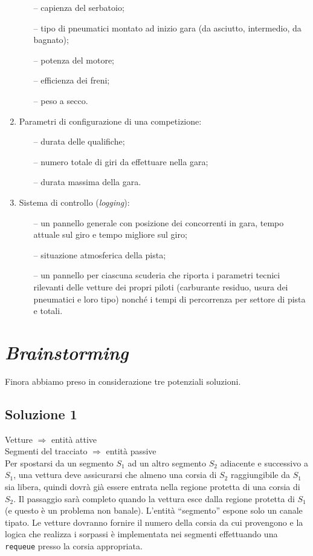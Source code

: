 \documentclass[11pt,a4paper]{report}
\begin{document}
\begin{enumerate}
\begin{itemize}
        \item[--] capienza del serbatoio;
        \item[--] tipo di pneumatici montato ad inizio gara (da asciutto, intermedio, da bagnato);
        \item[--] potenza del motore;
        \item[--] efficienza dei freni;
        \item[--] peso a secco.
    \end{itemize}
    \item Parametri di configurazione di una competizione:
    \begin{itemize}
        \item[--] durata delle qualifiche;
        \item[--] numero totale di giri da effettuare nella gara;
        \item[--] durata massima della gara.
    \end{itemize}
    \item Sistema di controllo (\textit{logging}):
    \begin{itemize}
        \item[--] un pannello generale con posizione dei concorrenti in gara, tempo attuale sul giro e tempo migliore sul giro;
        \item[--] situazione atmosferica della pista;
        \item[--] un pannello per ciascuna scuderia che riporta i parametri tecnici rilevanti delle vetture dei propri piloti (carburante residuo, usura dei pneumatici e loro tipo) nonché i tempi di percorrenza per settore di pista e totali.
    \end{itemize}
\end{enumerate}

\chapter{\textit{Brainstorming}}
Finora abbiamo preso in considerazione tre potenziali soluzioni.

\section*{Soluzione 1}
Vetture $\Rightarrow$ entità attive \\
Segmenti del tracciato $\Rightarrow$ entità passive \\

Per spostarsi da un segmento $S_1$ ad un altro segmento $S_2$ adiacente e successivo a $S_1$, una vettura deve assicurarsi che almeno una corsia di $S_2$ raggiungibile da $S_1$ sia libera, quindi dovrà già essere entrata nella regione protetta di una corsia di $S_2$. Il passaggio sarà completo quando la vettura esce dalla regione protetta di $S_1$ (e questo è un problema non banale). L'entità ``segmento'' espone solo un canale tipato. Le vetture dovranno fornire il numero della corsia da cui provengono e la logica che realizza i sorpassi è implementata nei segmenti effettuando una \texttt{requeue} presso la corsia appropriata.
\end{document}
